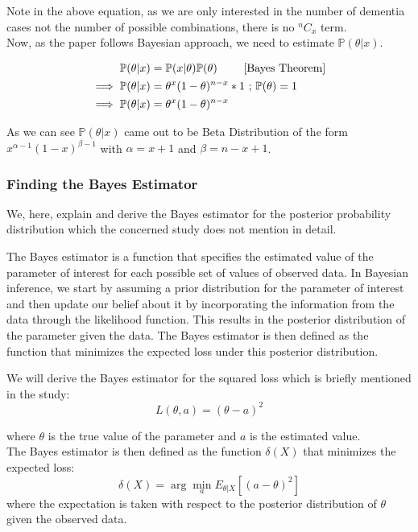 \documentclass[12pt,letterpaper]{article}
\begin{document}
Note in the above equation, as we are only interested in the number of dementia cases not the number of possible combinations, there is no $^nC_x$ term. \\

Now, as the paper follows Bayesian approach, we need to estimate $\mathbb{P}(\theta | x)$.

\begin{align*}
\mathbb{P}(\theta | x) &= \mathbb{P}(x | \theta) \mathbb{P}(\theta) \text{      \tag*{[Bayes Theorem]}}\\
\implies \mathbb{P}(\theta | x) &= \theta^x(1-\theta)^{n - x} * 1 \text{ ; }\mathbb{P}(\theta) = 1 \\
\implies \mathbb{P}(\theta | x) &= \theta^x(1-\theta)^{n - x} \\
\end{align*}

As we can see $\mathbb{P}(\theta | x)$ came out to be Beta Distribution of the form $x^{\alpha-1}(1-x)^{\beta-1}$ with $\alpha = x + 1$ and $\beta = n - x + 1$. 


\subsubsection{Finding the Bayes Estimator}
We, here, explain and derive the Bayes estimator for the posterior probability distribution which the concerned study does not mention in detail.

The Bayes estimator is a function that specifies the estimated value of the parameter of interest for each possible set of values of observed data. In Bayesian inference, we start by assuming a prior distribution for the parameter of interest and then update our belief about it by incorporating the information from the data through the likelihood function. This results in the posterior distribution of the parameter given the data. The Bayes estimator is then defined as the function that minimizes the expected loss under this posterior distribution.
 
We will derive the Bayes estimator for the squared loss which is briefly mentioned in the study:
$$L(\theta, a) = (\theta - a)^2$$

where $\theta$ is the true value of the parameter and $a$ is the estimated value. \\

The Bayes estimator is then defined as the function $\delta(X)$ that minimizes the expected loss:
$$\delta(X) = \arg \min_a E_{\theta | X} [(a - \theta)^2]$$
where the expectation is taken with respect to the posterior distribution of $\theta$ given the observed data. \\
\end{document}
